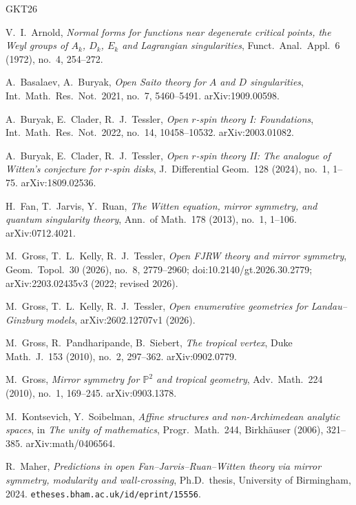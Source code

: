 \documentclass[11pt]{amsart}
\theoremstyle{definition}
\theoremstyle{remark}
\begin{document}
\begin{thebibliography}{GKT26}

 V.~I.~Arnold,
\emph{Normal forms for functions near degenerate critical points, the Weyl
groups of $A_k$, $D_k$, $E_k$ and Lagrangian singularities},
Funct.\ Anal.\ Appl.\ 6 (1972), no.~4, 254--272.

 A.~Basalaev, A.~Buryak,
\emph{Open Saito theory for $A$ and $D$ singularities},
Int.\ Math.\ Res.\ Not.\ 2021, no.~7, 5460--5491. arXiv:1909.00598.

 A.~Buryak, E.~Clader, R.~J.~Tessler,
\emph{Open $r$-spin theory I: Foundations},
Int.\ Math.\ Res.\ Not.\ 2022, no.~14, 10458--10532. arXiv:2003.01082.

 A.~Buryak, E.~Clader, R.~J.~Tessler,
\emph{Open $r$-spin theory II: The analogue of Witten's conjecture for $r$-spin
disks}, J.\ Differential Geom.\ 128 (2024), no.~1, 1--75. arXiv:1809.02536.

 H.~Fan, T.~Jarvis, Y.~Ruan,
\emph{The Witten equation, mirror symmetry, and quantum singularity theory},
Ann.\ of Math.\ 178 (2013), no.~1, 1--106. arXiv:0712.4021.

 M.~Gross, T.~L.~Kelly, R.~J.~Tessler,
\emph{Open FJRW theory and mirror symmetry},
Geom.~Topol.~30 (2026), no.~8, 2779--2960; doi:10.2140/gt.2026.30.2779;
arXiv:2203.02435v3 (2022; revised 2026).

 M.~Gross, T.~L.~Kelly, R.~J.~Tessler,
\emph{Open enumerative geometries for Landau--Ginzburg models},
arXiv:2602.12707v1 (2026).

 M.~Gross, R.~Pandharipande, B.~Siebert,
\emph{The tropical vertex}, Duke Math.\ J.\ 153 (2010), no.~2, 297--362.
arXiv:0902.0779.

 M.~Gross,
\emph{Mirror symmetry for $\mathbb{P}^{2}$ and tropical geometry},
Adv.\ Math.\ 224 (2010), no.~1, 169--245. arXiv:0903.1378.

 M.~Kontsevich, Y.~Soibelman,
\emph{Affine structures and non-Archimedean analytic spaces},
in \emph{The unity of mathematics}, Progr.\ Math.\ 244, Birkh\"auser (2006),
321--385. arXiv:math/0406564.

 R.~Maher,
\emph{Predictions in open Fan--Jarvis--Ruan--Witten theory via mirror symmetry,
modularity and wall-crossing}, Ph.D.\ thesis, University of Birmingham, 2024.
\texttt{etheses.bham.ac.uk/id/eprint/15556}.


\end{thebibliography}
\end{document}
